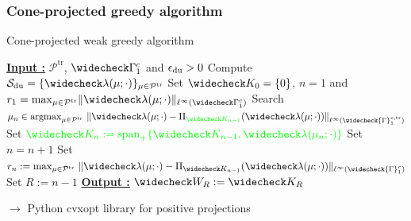 \documentclass[a4paper,10pt]{beamer}
\newcommand\gr[1]{\textcolor{green} {#1} }
\newcommand\bl[1]{\textcolor{blue} {#1} }
\begin{document}
\appendix\begin{frame}
	\frametitle{Cone-projected greedy algorithm}
	\vspace{-0.4cm}
	\begin{algorithm}[H]
		\caption{Cone-projected weak greedy algorithm}
		\begin{algorithmic}[1]
			\Statex \textbf{\underline{Input :}}
			$\mathcal{P}^\mathrm{tr}$, $\widecheck\Gamma_1^{c}$
			and $\epsilon_{\rm du}>0$
			\State Compute $\mathcal S_{\rm du}
			= \{\widecheck\lambda(\mu;\cdot)\}_{\mu\in\mathcal{P}^\mathrm{tr}}$
			\State Set $\widecheck K_0 = \{ 0\}$, $n=1$ and $r_1 =
			{\mathrm{max}}_{\mu \in\mathcal P^{\mathrm{tr}}}\| \widecheck\lambda(\mu;\cdot)\|_{\ell^\infty(\widecheck \Gamma_1^{c})}$
			\State Search  \bl{$\mu_n\in
				{\mathrm{argmax}}_{\mu \in\mathcal P^{\mathrm{tr}}}\ \| \widecheck\lambda(\mu;\cdot)-\Pi_{\gr{\widecheck K_{n-1}}}(\widecheck\lambda(\mu;\cdot))\|_{\ell^\infty(\widecheck{\Gamma}_{1}^{c,{\rm tr}})}$}
			\State Set $\gr{\widecheck K_n := {\rm span}_+\{\widecheck K_{n-1},\widecheck\lambda(\mu_{n};\cdot)\}}$
			\State Set $n=n+1$
			\State Set $r_{n} := 
			{\mathrm{max}}_{\mu \in\mathcal P^{\mathrm{tr}}}\ \| \widecheck\lambda(\mu;\cdot)-\Pi_{\widecheck K_{n-1}}(\widecheck\lambda(\mu;\cdot))\|_{\ell^\infty(\widecheck{\Gamma}_{1}^{c})}$\label{mx}
			\EndWhile
			\State Set $R:=n-1$
			\Statex \textbf{\underline {Output :}}
			$\widecheck W_R:=\widecheck K_{R}$
			\vspace{0.2cm}
		\end{algorithmic}
	\end{algorithm}
	\vspace{-0.3cm}
	$\rightarrow$ Python {cvxopt} library for positive projections
\end{frame}


 
\end{document}

